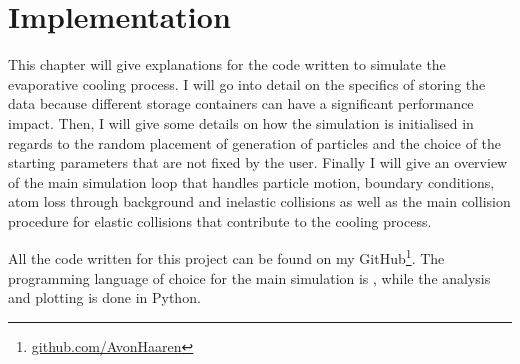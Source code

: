 

\chapter{Implementation}
This chapter will give explanations for the code written to simulate the evaporative cooling process. I will go into detail on the specifics of storing the data because different storage containers can have a significant performance impact. Then, I will give some details on how the simulation is initialised in regards to the random placement of generation of particles and the choice of the starting parameters that are not fixed by the user. Finally I will give an overview of the main simulation loop that handles particle motion, boundary conditions, atom loss through background and inelastic collisions as well as the main collision procedure for elastic collisions that contribute to the cooling process.

All the code written for this project can be found on my GitHub\footnote{\url{github.com/AvonHaaren}}. The programming language of choice for the main simulation is \Cpp, while the analysis and plotting is done in Python. 
%
